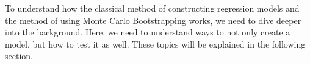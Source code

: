 \noindent To understand how the classical method of constructing regression models and the method of using Monte Carlo Bootstrapping works, we need to dive deeper into the background. Here, we need to understand ways to not only create a model, but how to test it as well. These topics will be explained in the following section.

